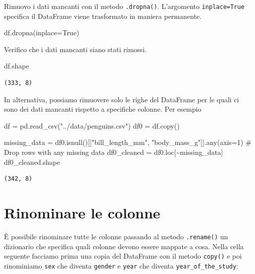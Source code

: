 \documentclass[
  letterpaper,
  krantz2]{{[}./krantz{]}}
\newenvironment{Shaded}{\begin{snugshade}}{\end{snugshade}}
\newcommand{\BuiltInTok}[1]{\textcolor[rgb]{0.00,0.23,0.31}{#1}}
\newcommand{\CommentTok}[1]{\textcolor[rgb]{0.37,0.37,0.37}{#1}}
\newcommand{\DecValTok}[1]{\textcolor[rgb]{0.68,0.00,0.00}{#1}}
\newcommand{\NormalTok}[1]{\textcolor[rgb]{0.00,0.23,0.31}{#1}}
\newcommand{\OperatorTok}[1]{\textcolor[rgb]{0.37,0.37,0.37}{#1}}
\newcommand{\StringTok}[1]{\textcolor[rgb]{0.13,0.47,0.30}{#1}}
\newcommand{\VariableTok}[1]{\textcolor[rgb]{0.07,0.07,0.07}{#1}}
\begin{document}
Rimuovo i dati mancanti con il metodo \texttt{.dropna()}. L'argomento
\texttt{inplace=True} specifica il DataFrame viene trasformato in
maniera permanente.

\begin{Shaded}
\begin{Highlighting}[]
\NormalTok{df.dropna(inplace}\OperatorTok{=}\VariableTok{True}\NormalTok{)}
\end{Highlighting}
\end{Shaded}

Verifico che i dati mancanti siano stati rimossi.

\begin{Shaded}
\begin{Highlighting}[]
\NormalTok{df.shape}
\end{Highlighting}
\end{Shaded}

\begin{verbatim}
(333, 8)
\end{verbatim}

In alternativa, possiamo rimuovere solo le righe del DataFrame per le
quali ci sono dei dati mancanti rispetto a specifiche colonne. Per
esempio

\begin{Shaded}
\begin{Highlighting}[]
\NormalTok{df }\OperatorTok{=}\NormalTok{ pd.read\_csv(}\StringTok{"../data/penguins.csv"}\NormalTok{)}
\NormalTok{df0 }\OperatorTok{=}\NormalTok{ df.copy()}

\NormalTok{missing\_data }\OperatorTok{=}\NormalTok{ df0.isnull()[[}\StringTok{"bill\_length\_mm"}\NormalTok{, }\StringTok{"body\_mass\_g"}\NormalTok{]].}\BuiltInTok{any}\NormalTok{(axis}\OperatorTok{=}\DecValTok{1}\NormalTok{)}
\CommentTok{\# Drop rows with any missing data}
\NormalTok{df0\_cleaned }\OperatorTok{=}\NormalTok{ df0.loc[}\OperatorTok{\textasciitilde{}}\NormalTok{missing\_data]}
\NormalTok{df0\_cleaned.shape}
\end{Highlighting}
\end{Shaded}

\begin{verbatim}
(342, 8)
\end{verbatim}

\section{Rinominare le colonne}\label{rinominare-le-colonne}

È possibile rinominare tutte le colonne passando al metodo
\texttt{.rename()} un dizionario che specifica quali colonne devono
essere mappate a cosa. Nella cella seguente facciamo prima una copia del
DataFrame con il metodo \texttt{copy()} e poi rinominiamo \texttt{sex}
che diventa \texttt{gender} e \texttt{year} che diventa
\texttt{year\_of\_the\_study}:
\end{document}
